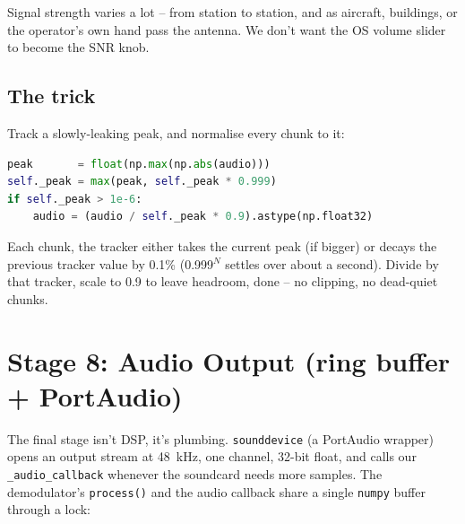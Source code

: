 \documentclass[11pt,a4paper]{article}
\begin{document}
Signal strength varies a lot -- from station to station, and as
aircraft, buildings, or the operator's own hand pass the antenna.  We
don't want the OS volume slider to become the SNR knob.

\subsection{The trick}

Track a slowly-leaking peak, and normalise every chunk to it:
\begin{lstlisting}[language=Python]
peak       = float(np.max(np.abs(audio)))
self._peak = max(peak, self._peak * 0.999)
if self._peak > 1e-6:
    audio = (audio / self._peak * 0.9).astype(np.float32)
\end{lstlisting}

Each chunk, the tracker either takes the current peak (if bigger) or
decays the previous tracker value by 0.1\% (0.999\(^N\) settles over
about a second).  Divide by that tracker, scale to 0.9 to leave
headroom, done -- no clipping, no dead-quiet chunks.

\begin{center}
\end{center}

\section{Stage 8: Audio Output (ring buffer + PortAudio)}

The final stage isn't DSP, it's plumbing.  \texttt{sounddevice} (a
PortAudio wrapper) opens an output stream at \SI{48}{kHz}, one channel,
32-bit float, and calls our \texttt{\_audio\_callback} whenever the
soundcard needs more samples.  The demodulator's \texttt{process()} and
the audio callback share a single \texttt{numpy} buffer through a lock:
\end{document}
